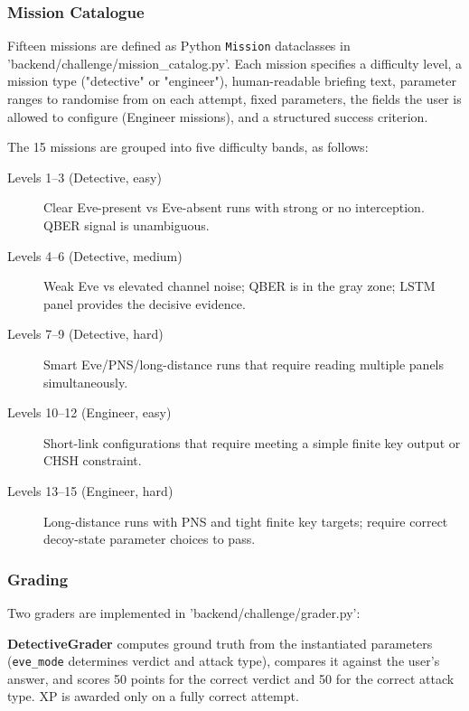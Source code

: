 \documentclass[12pt, a4paper]{article}
\begin{document}
\subsubsection{Mission Catalogue}
\label{sec:missions}

Fifteen missions are defined as Python \texttt{Mission} dataclasses in
'backend/challenge/mission\_catalog.py'. Each mission specifies a
difficulty level, a mission type ("detective" or
"engineer"), human-readable briefing text, parameter ranges to
randomise from on each attempt, fixed parameters, the fields the user
is allowed to configure (Engineer missions), and a structured success
criterion.

The 15 missions are grouped into five difficulty bands, as follows:

\begin{description}
  \item[Levels 1--3 (Detective, easy)] Clear Eve-present vs Eve-absent
        runs with strong or no interception. QBER signal is unambiguous.
  \item[Levels 4--6 (Detective, medium)] Weak Eve vs elevated channel
        noise; QBER is in the gray zone; LSTM panel provides the decisive
        evidence.
  \item[Levels 7--9 (Detective, hard)] Smart Eve/PNS/long-distance
        runs that require reading multiple panels simultaneously.
  \item[Levels 10--12 (Engineer, easy)] Short-link configurations that
        require meeting a simple finite key output or CHSH constraint.
  \item[Levels 13--15 (Engineer, hard)] Long-distance runs with PNS and
        tight finite key targets; require correct decoy-state parameter
        choices to pass.
\end{description}

\subsubsection{Grading}
\label{sec:grading}

Two graders are implemented in 'backend/challenge/grader.py':

\textbf{DetectiveGrader} computes ground truth from the instantiated
parameters (\texttt{eve\_mode} determines verdict and attack type),
compares it against the user's answer, and scores 50 points for the
correct verdict and 50 for the correct attack type. XP is awarded only
on a fully correct attempt.
\end{document}
